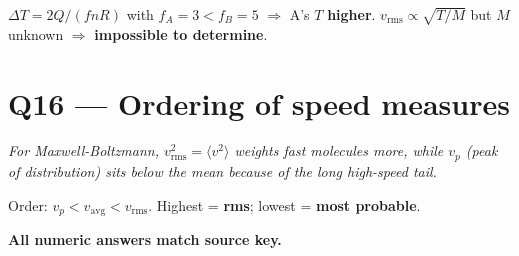 \documentclass[11pt]{article}
\begin{document}
$\Delta T = 2Q/(fnR)$ with $f_A=3 < f_B=5$ $\Rightarrow$ A's $T$ \textbf{higher}. $v_{\text{rms}}\propto\sqrt{T/M}$ but $M$ unknown $\Rightarrow$ \textbf{impossible to determine}.

\section*{Q16 --- Ordering of speed measures}
\emph{For Maxwell-Boltzmann, $v_{\text{rms}}^2 = \langle v^2\rangle$ weights fast molecules more, while $v_p$ (peak of distribution) sits below the mean because of the long high-speed tail.}

Order: $v_p < v_{\text{avg}} < v_{\text{rms}}$. Highest = \textbf{rms}; lowest = \textbf{most probable}.

\bigskip\noindent\textbf{All numeric answers match source key.}
\end{document}
